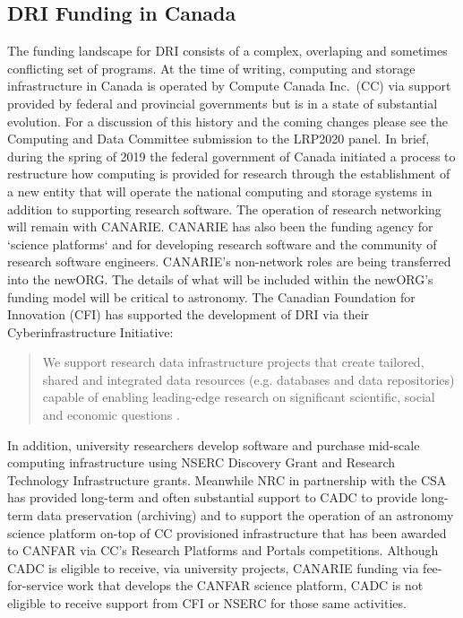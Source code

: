 \documentclass[11pt]{article}
\begin{document}
\subsection{DRI Funding in Canada}

The funding landscape for DRI consists of a complex, overlaping and sometimes conflicting set of programs. 
At the time of writing, computing and storage infrastructure in Canada is operated by Compute Canada Inc.\ (CC) via support provided by federal and provincial governments but is in a state of substantial evolution.  
For a discussion of this history and the coming changes please see the Computing and Data Committee submission to the LRP2020 panel. 
In brief, during the spring of 2019 the federal government of Canada initiated a process to restructure how computing is provided for research through the establishment of a new entity that will operate the national computing and storage systems in addition to supporting research software.  
The operation of research networking will remain with CANARIE.  
CANARIE has also been the funding agency for `science platforms` and for developing research software and the community of research software engineers.
CANARIE's non-network roles are being transferred into the newORG. The details of what will be included within the newORG's funding model will be critical to astronomy.
The Canadian Foundation for Innovation (CFI) has supported the development of DRI via their  Cyberinfrastructure Initiative:
\begin{quote}
    We support research data infrastructure projects that create tailored, shared and integrated data resources (e.g. databases and data repositories) capable of enabling leading-edge research on significant scientific, social and economic questions \citep{ciwebsite}.
\end{quote}
In addition, university researchers develop software and purchase mid-scale computing infrastructure using NSERC Discovery Grant and Research Technology Infrastructure grants.
Meanwhile NRC in partnership with the CSA has provided long-term and often substantial support to CADC to provide long-term data preservation (archiving) and to support the operation of an astronomy science platform on-top of CC provisioned infrastructure that has been awarded to CANFAR via CC's Research Platforms and Portals competitions.  Although CADC is eligible to receive, via university projects, CANARIE funding via fee-for-service work that develops the CANFAR science platform, CADC is not eligible to receive support from CFI or NSERC for those same activities. 
\end{document}
